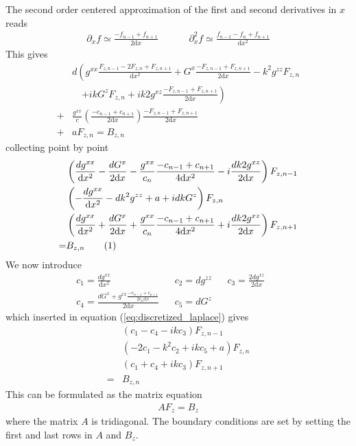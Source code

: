 \documentclass[12pt]{article}
\def\L{\left}
\def\R{\right}
\newcommand\numberthis{\addtocounter{equation}{1}\tag{\theequation}}
\begin{document}
The second order centered approximation of the first and second derivatives in
$x$ reads
%
\begin{align*}
    &&\partial_x f \simeq \frac{-f_{n-1} + f_{n+1}}{2\text{d}x}&&
    &&\partial_x^2 f \simeq \frac{f_{n-1} - f_{n} + f_{n+1}}{\text{d}x^2}&&
\end{align*}
%
This gives
%
\begin{align*}
    \, &d \L(    g^{xx} \frac{F_{z,n-1} - 2F_{z,n} + F_{z, n+1}}{\text{d}x^2} +
    G^x \frac{-F_{z,n-1} + F_{z,n+1}}{2\text{d}x} - k^2 g^{zz}F_{z,n} \R.\\
    &\quad\L.  + i kG^zF_{z,n} + i k2g^{xz} \frac{-F_{z,n-1} +
F_{z,n+1}}{2\text{d}x} \R) \\
%
    +& \frac{g^{xx}}{c} \L( \frac{-c_{n-1} + c_{n+1}}{2\text{d}x} \R)
\frac{-F_{z,n-1} + F_{z,n+1}}{2\text{d}x} \\
%
    +& aF_{z,n} = B_{z,n}
\end{align*}
%
collecting point by point
%
\begin{align*}
    &\L( \frac{dg^{xx}}{\text{d}x^2} - \frac{dG^x}{2\text{d}x} -
    \frac{g^{xx}}{c_{n}} \frac{-c_{n-1} + c_{n+1}}{4\text{d}x^2} - i\frac{d
    k2g^{xz}}{2\text{d}x} \R) F_{z,n-1} \\
    &\L( - \frac{ dg^{xx} }{\text{d}x^2} - dk^2 g^{zz} + a + idkG^z \R) F_{z,n}
    \\
    &\L( \frac{dg^{xx}}{\text{d}x^2} + \frac{dG^x}{2\text{d}x} +
    \frac{g^{xx}}{c_{n}} \frac{-c_{n-1} + c_{n+1}}{4\text{d}x^2} +
    i\frac{dk2g^{xz}}{2\text{d}x} \R) F_{z, n+1} \\
%
     =& B_{z,n} \numberthis
    \label{eq:discretized_laplace}
\end{align*}
%
We now introduce
%
\begin{align*}
    &c_1 = \frac{dg^{xx}}{\text{d}x^2}& &c_2 = dg^{zz}& &c_3 =
    \frac{2dg^{xz}}{2\text{d}x}& && \\ &c_4 = \frac{dG^x + g^{xx}\frac{-c_{n-1}
    + c_{n+1}}{2c_n\text{d}x}}{2\text{d}x}& &c_5 = dG^z& &&
\end{align*}
%
which inserted in equation (\ref{eq:discretized_laplace}) gives
%
\begin{align*}
    &\L( c_1 - c_4 -ikc_3 \R) F_{z,n-1} \\
    &\L( -2c_1 - k^2c_2 +ikc_5 + a \R) F_{z,n} \\
    &\L( c_1 + c_4 + ikc_3 \R) F_{z, n+1} \\
%
     =& B_{z,n}
\end{align*}
%
This can be formulated as the matrix equation
%
\begin{align*}
    AF_z=B_z
\end{align*}
%
where the matrix $A$ is tridiagonal. The boundary conditions are set by setting
the first and last rows in $A$ and $B_z$.
%
\end{document}
